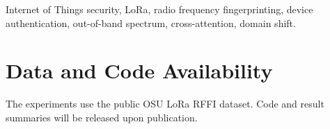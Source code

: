 \documentclass[journal]{IEEEtran}
\begin{document}
\begin{IEEEkeywords}
Internet of Things security, LoRa, radio frequency fingerprinting, device authentication, out-of-band spectrum, cross-attention, domain shift.
\end{IEEEkeywords}










\section*{Data and Code Availability}
The experiments use the public OSU LoRa RFFI dataset. Code and result summaries will be released upon publication.



\end{document}

